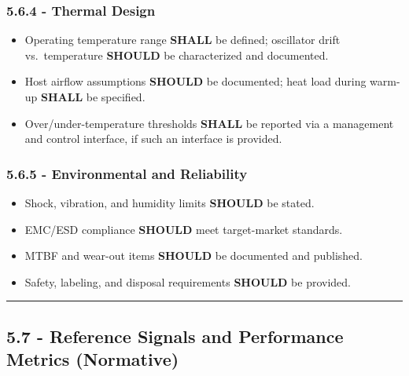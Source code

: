 \subsubsection{5.6.4 - Thermal Design}\label{thermal-design}

\begin{itemize}
\tightlist
\item
  Operating temperature range \textbf{SHALL} be defined; oscillator
  drift vs.~temperature \textbf{SHOULD} be characterized and
  documented.\\
\item
  Host airflow assumptions \textbf{SHOULD} be documented; heat load
  during warm-up \textbf{SHALL} be specified.\\
\item
  Over/under-temperature thresholds \textbf{SHALL} be reported via a
  management and control interface, if such an interface is provided.
\end{itemize}

\subsubsection{5.6.5 - Environmental and
Reliability}\label{environmental-and-reliability}

\begin{itemize}
\tightlist
\item
  Shock, vibration, and humidity limits \textbf{SHOULD} be stated.\\
\item
  EMC/ESD compliance \textbf{SHOULD} meet target-market standards.\\
\item
  MTBF and wear-out items \textbf{SHOULD} be documented and published.\\
\item
  Safety, labeling, and disposal requirements \textbf{SHOULD} be
  provided.
\end{itemize}

\begin{center}\rule{0.5\linewidth}{0.5pt}\end{center}

\subsection{5.7 - Reference Signals and Performance Metrics
(Normative)}\label{reference-signals-and-performance-metrics-normative}

